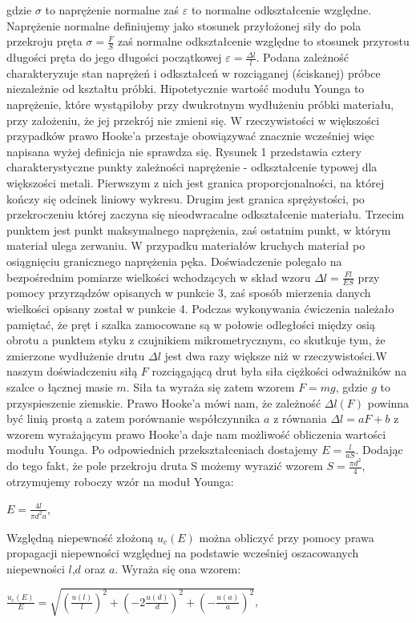 \documentclass[12pt]{article}
\begin{document}
gdzie $\sigma$ to naprężenie normalne zaś $\varepsilon$ to normalne odkształcenie względne. Naprężenie normalne definiujemy jako stosunek przyłożonej siły
do pola przekroju pręta $\sigma = \frac{F}{S}$ zaś normalne odkształcenie względne to stosunek przyrostu długości pręta do jego długości początkowej 
$ \varepsilon = \frac{\Delta{l}}{l}$. 
Podana zależność charakteryzuje stan naprężeń i odkształceń w rozciąganej (ściskanej) próbce niezależnie od kształtu próbki. \newline
Hipotetycznie wartość modułu Younga to naprężenie, które wystąpiłoby przy dwukrotnym wydłużeniu próbki materiału, przy założeniu, że jej przekrój nie zmieni się.
	W rzeczywistości w większości przypadków prawo Hooke'a przestaje obowiązywać znacznie wcześniej więc napisana wyżej definicja nie sprawdza się. Rysunek 1 przedstawia cztery charakterystyczne punkty zależności naprężenie - odkształcenie typowej dla większości metali. Pierwszym z nich jest granica proporcjonalności, na której kończy się odcinek liniowy wykresu. Drugim jest granica sprężystości, po przekroczeniu której zaczyna się nieodwracalne odkształcenie materiału. Trzecim punktem jest punkt maksymalnego naprężenia, zaś ostatnim punkt, w którym materiał ulega zerwaniu. W przypadku materiałów kruchych materiał po osiągnięciu granicznego naprężenia pęka. \newline
Doświadczenie polegało na bezpośrednim pomiarze wielkości wchodzących w skład wzoru $ \Delta{l} = \frac{F l}{E S} $ przy pomocy przyrządzów opisanych w punkcie 3, zaś sposób mierzenia danych wielkości opisany został w punkcie 4. Podczas wykonywania ćwiczenia należało pamiętać, że pręt i szalka zamocowane są w połowie odległości między osią obrotu a punktem styku z czujnikiem mikrometrycznym, co skutkuje tym, że zmierzone wydłużenie drutu $\Delta{l}$ jest dwa razy większe niż w rzeczywistości.\newline W naszym doświadczeniu siłą $F$ rozciągającą drut była siła ciężkości odważników na szalce o łącznej masie $m$. Siła ta wyraża się zatem wzorem $F = mg$, gdzie $g$ to przyspieszenie ziemskie. Prawo Hooke'a mówi nam, że zależność $\Delta{l}(F)$ powinna być linią prostą a zatem porównanie współczynnika $a$ z równania $ \Delta{l} = aF + b$ z wzorem wyrażającym prawo Hooke'a daje nam możliwość obliczenia wartości modułu Younga. Po odpowiednich przekształceniach dostajemy $E = \frac{l}{aS}$. Dodając do tego fakt, że pole przekroju druta S możemy wyrazić wzorem $S = \frac{\pi{d^2}}{4}$, otrzymujemy roboczy wzór na moduł Younga:
\begin{center}
\LARGE $ E = \frac{4l}{\pi{d^2}a} $,
\end{center}
Względną niepewność złożoną $u_c(E)$ można obliczyć przy pomocy prawa propagacji niepewności względnej na podstawie wcześniej oszacowanych niepewności $l$,$d$ oraz $a$. Wyraża się ona wzorem:
\begin{center}
\LARGE $ \frac{u_c(E)}{E} = \sqrt{(\frac{u(l)}{l})^2+(-2\frac{u(d)}{d})^2+(-\frac{u(a)}{a})^2} $,
\end{center} \newpage
\end{document}
